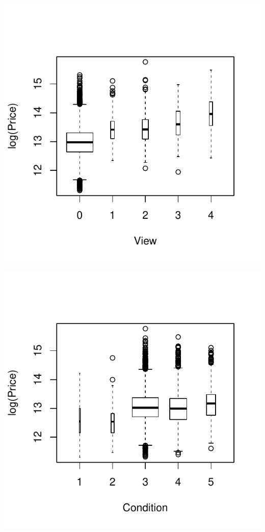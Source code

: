 \documentclass{article}\usepackage[]{graphicx}\usepackage[]{color}
\makeatletter
\def\maxwidth{ %
  \ifdim\Gin@nat@width>\linewidth
    \linewidth
  \else
    \Gin@nat@width
  \fi
}
\newenvironment{knitrout}{}{} %
\makeatother
\begin{document}
\begin{enumerate}
\begin{enumerate}
\begin{knitrout}
\includegraphics[width=\maxwidth]{figure/discrete-3} 

\includegraphics[width=\maxwidth]{figure/discrete-4} 


\end{knitrout}
\end{enumerate}
\end{enumerate}
\end{document}

